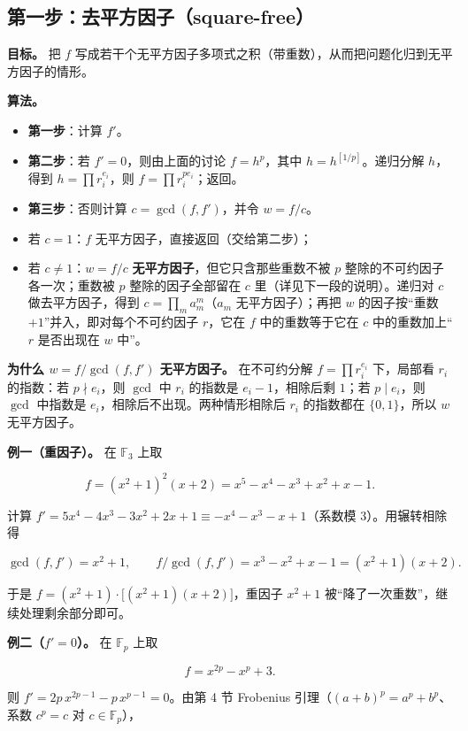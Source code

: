\subsection{第一步：去平方因子（square-free）}


\textbf{目标。} 把 $f$ 写成若干个无平方因子多项式之积（带重数），从而把问题化归到无平方因子的情形。

\textbf{算法。}

\begin{itemize}
\item \textbf{第一步}：计算 $f'$。
\item \textbf{第二步}：若 $f'=0$，则由上面的讨论 $f=h^p$，其中 $h=h^{[1/p]}$。递归分解 $h$，得到 $h=\prod r_i^{e_i}$，则 $f=\prod r_i^{p e_i}$；返回。
\item \textbf{第三步}：否则计算 $c=\gcd(f,f')$，并令 $w=f/c$。
\item 若 $c=1$：$f$ 无平方因子，直接返回（交给第二步）；
\item 若 $c\ne1$：$w=f/c$ \textbf{无平方因子}，但它只含那些重数不被 $p$ 整除的不可约因子各一次；重数被 $p$ 整除的因子全部留在 $c$ 里（详见下一段的说明）。递归对 $c$ 做去平方因子，得到 $c=\prod_m a_m^m$（$a_m$ 无平方因子）；再把 $w$ 的因子按“重数 $+1$”并入，即对每个不可约因子 $r$，它在 $f$ 中的重数等于它在 $c$ 中的重数加上“$r$ 是否出现在 $w$ 中”。
\end{itemize}


\textbf{为什么 $w=f/\gcd(f,f')$ 无平方因子。} 在不可约分解 $f=\prod r_i^{e_i}$ 下，局部看 $r_i$ 的指数：若 $p\nmid e_i$，则 $\gcd$ 中 $r_i$ 的指数是 $e_i-1$，相除后剩 $1$；若 $p\mid e_i$，则 $\gcd$ 中指数是 $e_i$，相除后不出现。两种情形相除后 $r_i$ 的指数都在 $\{0,1\}$，所以 $w$ 无平方因子。

\textbf{例一（重因子）。} 在 $\mathbb F_3$ 上取

\[
f=(x^2+1)^2(x+2)=x^5-x^4-x^3+x^2+x-1 .
\]

计算 $f'=5x^4-4x^3-3x^2+2x+1\equiv -x^4-x^3-x+1$（系数模 $3$）。用辗转相除得

\[
\gcd(f,f')=x^2+1,\qquad f/\gcd(f,f')=x^3-x^2+x-1=(x^2+1)(x+2).
\]

于是 $f=(x^2+1)\cdot\bigl[(x^2+1)(x+2)\bigr]$，重因子 $x^2+1$ 被“降了一次重数”，继续处理剩余部分即可。

\textbf{例二（$f'=0$）。} 在 $\mathbb F_p$ 上取

\[
f=x^{2p}-x^p+3 .
\]

则 $f'=2p\,x^{2p-1}-p\,x^{p-1}=0$。由第 4 节 Frobenius 引理（$(a+b)^p=a^p+b^p$、系数 $c^p=c$ 对 $c\in\mathbb F_p$），

